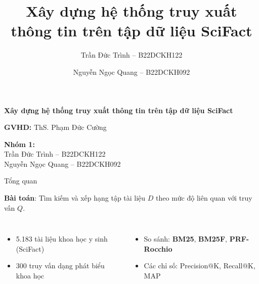 \documentclass[10pt,aspectratio=169]{beamer}
\title[Đồ án IR]{Xây dựng hệ thống truy xuất thông tin trên tập dữ liệu SciFact}
\author{Trần Đức Trình -- B22DCKH122 \and Nguyễn Ngọc Quang -- B22DCKH092}
\institute{Học viện Công nghệ Bưu chính Viễn thông}
\date{\the\year}
\begin{document}
\begin{frame}[plain]
    \centering

    {\bfseries\color{ptitblue}\Large Xây dựng hệ thống truy xuất thông tin trên tập dữ liệu SciFact}

    \vspace{1.5cm}

    {\normalsize \textbf{GVHD:} ThS. Phạm Đức Cường}

    \vspace{0.7cm}

    {\normalsize 
        \textbf{Nhóm 1:}\\[2pt]
        Trần Đức Trình -- B22DCKH122\\
        Nguyễn Ngọc Quang -- B22DCKH092
    }
\end{frame}

\begin{frame}{Tổng quan}
\begin{tcolorbox}[colback=lightblue,colframe=ptitblue,title=Vấn đề cần giải quyết]
\smallskip
\textbf{Bài toán}: Tìm kiếm và xếp hạng tập tài liệu $D$ theo mức độ liên quan với truy vấn $Q$.
\end{tcolorbox}

\vspace{.7em}
\begin{columns}[T,onlytextwidth]
\begin{itemize}
\item 5.183 tài liệu khoa học y sinh (SciFact)
\item 300 truy vấn dạng phát biểu khoa học
\end{itemize}

\begin{itemize}
\item So sánh: \textbf{BM25}, \textbf{BM25F}, \textbf{PRF-Rocchio}
\item Các chỉ số: Precision@K, Recall@K, MAP
\end{itemize}
\end{columns}
\end{frame}
\end{document}
